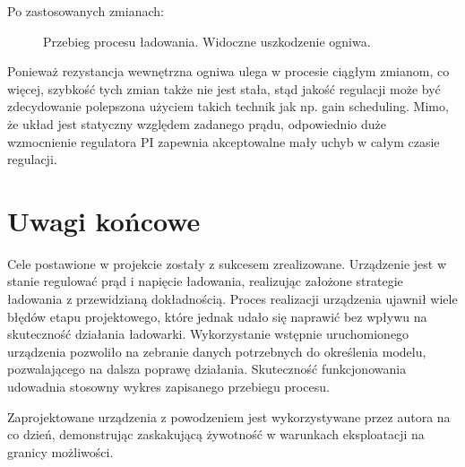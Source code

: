 \documentclass[polish,engineer]{polsl-msth}
\begin{document}
Po zastosowanych zmianach:
\begin{figure}[hbtp]
    
     \caption{Przebieg procesu ładowania. Widoczne uszkodzenie ogniwa. \label{img:PrettyChargeWithCellFailure}}
\end{figure}
Ponieważ rezystancja wewnętrzna ogniwa ulega w procesie ciągłym zmianom, co więcej, szybkość tych zmian także nie jest stała, stąd jakość regulacji może być zdecydowanie polepszona użyciem takich technik jak np. gain scheduling.
Mimo, że układ jest statyczny względem zadanego prądu, odpowiednio duże wzmocnienie regulatora PI zapewnia akceptowalne mały uchyb w całym czasie regulacji. 

\chapter{Uwagi końcowe}
Cele postawione w projekcie zostały z sukcesem zrealizowane. Urządzenie jest w stanie regulować prąd i napięcie ładowania, realizując założone strategie ładowania z przewidzianą dokładnością. Proces realizacji urządzenia ujawnił wiele błędów etapu projektowego, które jednak udało się naprawić bez wpływu na skuteczność działania ładowarki. Wykorzystanie wstępnie uruchomionego urządzenia pozwoliło na zebranie danych potrzebnych do określenia modelu, pozwalającego na dalsza poprawę działania. Skuteczność funkcjonowania udowadnia stosowny wykres zapisanego przebiegu procesu.

Zaprojektowane urządzenia z powodzeniem jest wykorzystywane przez autora na co dzień, demonstrując zaskakującą żywotność w warunkach eksploatacji na granicy możliwości.


 

\end{document}
